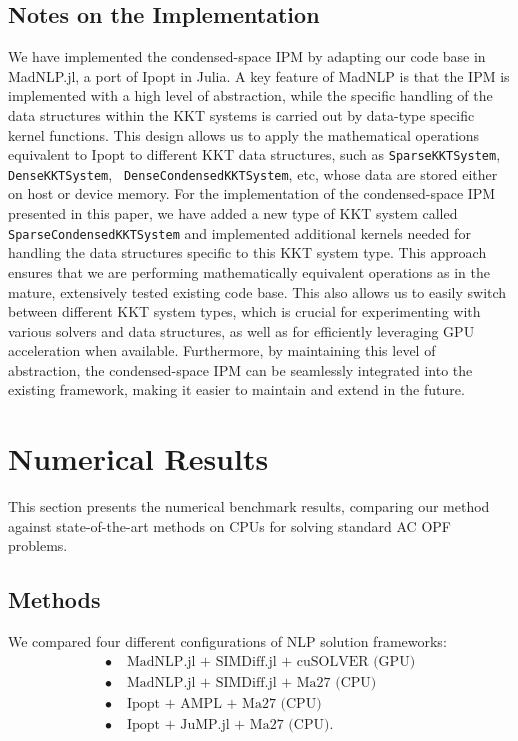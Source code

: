 \subsection{Notes on the Implementation}
We have implemented the condensed-space IPM by adapting our code base
in MadNLP.jl, a port of Ipopt in Julia.
A key feature of MadNLP is that the IPM is implemented with a
high level of abstraction, while the specific handling of the data
structures within the KKT systems is carried out by data-type specific
kernel functions. This design allows us to apply the mathematical
operations equivalent to Ipopt to different KKT data structures, such as
{\tt SparseKKTSystem}, {\tt DenseKKTSystem}, {\tt
DenseCondensedKKTSystem}, etc, whose data are stored either on host or
device memory. For the implementation of the condensed-space IPM
presented in this paper, we have added a new type of KKT system called
{\tt SparseCondensedKKTSystem} and implemented additional kernels
needed for handling the data structures specific to this KKT system
type. This approach ensures that we are performing mathematically
equivalent operations as in the mature, extensively tested existing
code base. This also allows us to easily switch between different KKT
system types, which is crucial for experimenting with various solvers
and data structures, as well as for efficiently leveraging GPU
acceleration when available. Furthermore, by maintaining this level of
abstraction, the condensed-space IPM can be seamlessly integrated into
the existing framework, making it easier to maintain and extend in the
future.

\section{Numerical Results}\label{sec:num}

This section presents the numerical benchmark results, comparing our
method against state-of-the-art methods on CPUs for solving standard
AC OPF problems.

\subsection{Methods}

We compared four different configurations of NLP solution frameworks:
\begin{align}
  \label{config-1}\tag{Config 1} \bullet\;&\text{MadNLP.jl + SIMDiff.jl + cuSOLVER (GPU)}\\
  \label{config-2}\tag{Config 2} \bullet\;&\text{MadNLP.jl + SIMDiff.jl + Ma27 (CPU)}\\
  \label{config-3}\tag{Config 3} \bullet\;&\text{Ipopt + AMPL + Ma27 (CPU)}\\
  \label{config-4}\tag{Config 4} \bullet\;&\text{Ipopt + JuMP.jl + Ma27 (CPU)}.
\end{align}

